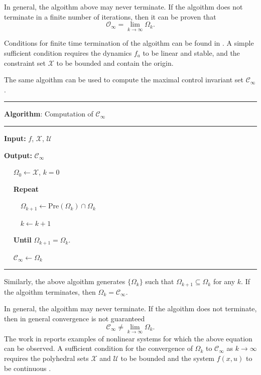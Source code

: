 \documentclass[
]{book}
\theoremstyle{definition}
\theoremstyle{definition}
\theoremstyle{definition}
\theoremstyle{definition}
\theoremstyle{remark}
\begin{document}
In general, the algoithm above may never terminate. If the algoithm does not terminate in a finite number of iterations, then it can be proven that \citep{kolmanovsky98mpe-theory}
\[
\mathcal{O}_{\infty} = \lim_{k \rightarrow \infty} \Omega_k.
\]

Conditions for finite time termination of the algoithm can be found in \citep{gilbert91tac-linear}. A simple sufficient condition requires the dynamics \(f_a\) to be linear and stable, and the constraint set \(\mathcal{X}\) to be bounded and contain the origin.

The same algoithm can be used to compute the maximal control invariant set \(\mathcal{C}_{\infty}\).

\begin{center}\rule{0.5\linewidth}{0.5pt}\end{center}

\textbf{Algorithm}: Computation of \(\mathcal{C}_{\infty}\)

\begin{center}\rule{0.5\linewidth}{0.5pt}\end{center}

\textbf{Input:} \(f\), \(\mathcal{X}\), \(\mathcal{U}\)

\textbf{Output:} \(\mathcal{C}_{\infty}\)

~~ \(\Omega_0 \leftarrow \mathcal{X}\), \(k=0\)

~~ \textbf{Repeat}

~~~~ \(\Omega_{k+1} \leftarrow \text{Pre}(\Omega_k) \cap \Omega_k\)

~~~~ \(k \leftarrow k+1\)

~~ \textbf{Until} \(\Omega_{k+1} = \Omega_k\).

~~ \(\mathcal{C}_{\infty} \leftarrow \Omega_k\)

\begin{center}\rule{0.5\linewidth}{0.5pt}\end{center}

Similarly, the above algoithm generates \(\{\Omega_k \}\) such that \(\Omega_{k+1} \subseteq \Omega_k\) for any \(k\). If the algoithm terminates, then \(\Omega_k = \mathcal{C}_{\infty}\).

In general, the algoithm may never terminate. If the algoithm does not terminate, then in general convergence is not guaranteed
\[
\mathcal{C}_{\infty} \neq \lim_{k \rightarrow \infty} \Omega_k.
\]
The work in \citep{bertsekas72tac-infinite} reports examples of nonlinear systems for which the above equation can be observed. A sufficient condition for the convergence of \(\Omega_k\) to \(\mathcal{C}_{\infty}\) as \(k \rightarrow \infty\) requires the polyhedral sets \(\mathcal{X}\) and \(\mathcal{U}\) to be bounded and the system \(f(x,u)\) to be continuous \citep{bertsekas72tac-infinite}.
\end{document}
